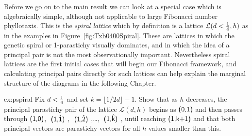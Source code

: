 Before we go on to the main result we can look at a special case which is algebraically simple, although not applicable to large Fibonacci number phyllotaxis. This is the \emph{spiral lattice} which by definition is a lattice $\mathcal{L}(d<\textstyle{\frac{1}{4}},h)$ as in the examples in Figure~\ref{fig:Txb0400Spiral}. These are lattices in which
the genetic spiral or 1-parastichy visually dominates, and in which the idea of a principal pair is not the most observationally important. 
%
Nevertheless spiral lattices are the first initial cases that will begin
our Fibonacci framework, and calculating principal pairs directly for such lattices can help explain the marginal structure of the diagrams in the following Chapter.
\begin{jExercise}{ex:pspiral}
	Fix  $d<\textstyle{\frac{1}{4}}$ and set  $k=\lfloor1/2d\rfloor-1$.
	Show that as $h$ decreases, the principal parastichy pair of the lattice $\mathcal{L}(d,h)$ begins as 
	 $\textsf{(0,1)}$ and then passes through $\textsf{(1,0)}$,  $\textsf{ (\ensuremath{\textsf{1}},\ensuremath{\hat{\textsf{1}}}) }$,
	  $\textsf{ (\ensuremath{\textsf{1}},\ensuremath{\hat{\textsf{2}}}) }$,\ldots ,  $\textsf{ (\ensuremath{\textsf{1}},\ensuremath{\hat{\textsf{k}}}) }$, until reaching $\textsf{(1,k+1)}$ and that  both principal vectors are parastichy vectors for all $h$ values smaller than this. 
	 
\end{jExercise} 
